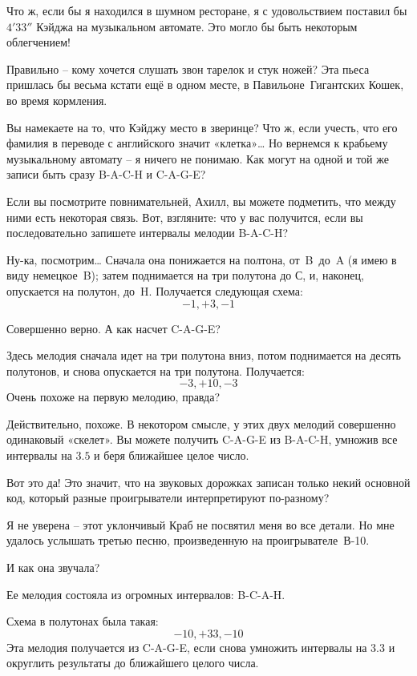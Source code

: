 \documentclass[../main.tex]{subfiles}
\begin{document}
\begin{Dialogue}
 Что ж, если бы я находился в шумном ресторане, я с удовольствием поставил бы $4'33''$ Кэйджа на музыкальном автомате. Это могло бы быть некоторым облегчением!

 Правильно \--- кому хочется слушать звон тарелок и стук ножей? Эта пьеса пришлась бы весьма кстати ещё в одном месте, в Павильоне~Гигантских Кошек, во время кормления.

 Вы намекаете на то, что Кэйджу место в зверинце? Что ж, если учесть, что его фамилия в переводе с английского значит «клетка»\ldots{} Но вернемся к крабьему музыкальному автомату \--- я ничего не понимаю. Как могут на одной и той же записи быть сразу \mbox{B-A-C-H} и \mbox{C-A-G-E}?

 Если вы посмотрите повнимательней, Ахилл, вы можете подметить, что между ними есть некоторая связь. Вот, взгляните: что у вас получится, если вы последовательно запишете интервалы мелодии \mbox{B-A-C-H}?

 Ну-ка, посмотрим\ldots{} Сначала она понижается на полтона, от~B~до~A (я имею в виду немецкое~B); затем поднимается на три полутона до С, и, наконец, опускается на полутон, до~H. Получается следующая схема:
\[
    -1, +3, -1
\]

 Совершенно верно. А как насчет \mbox{C-A-G-E}?

 Здесь мелодия сначала идет на три полутона вниз, потом поднимается на десять полутонов, и снова опускается на три полутона. Получается:
\[
    -3, +10, -3
\]
Очень похоже на первую мелодию, правда?

 Действительно, похоже. В некотором смысле, у этих двух мелодий совершенно одинаковый «скелет». Вы можете получить \mbox{C-A-G-E} из \mbox{B-A-C-H}, умножив все интервалы на $3.5$ и беря ближайшее целое число.

 Вот это да! Это значит, что на звуковых дорожках записан только некий основной код, который разные проигрыватели интерпретируют по-разному?

 Я не уверена \--- этот уклончивый Краб не посвятил меня во все детали. Но мне удалось услышать третью песню, произведенную на проигрывателе~\mbox{В-10}.

 И как она звучала?

 Ее мелодия состояла из огромных интервалов: \mbox{B-C-A-H}.

Схема в полутонах была такая:
\[
    -10, +33, -10
\]
Эта мелодия получается из \mbox{C-A-G-E}, если снова умножить интервалы на $3.3$ и округлить результаты до ближайшего целого числа.


\end{Dialogue}
\end{document}
